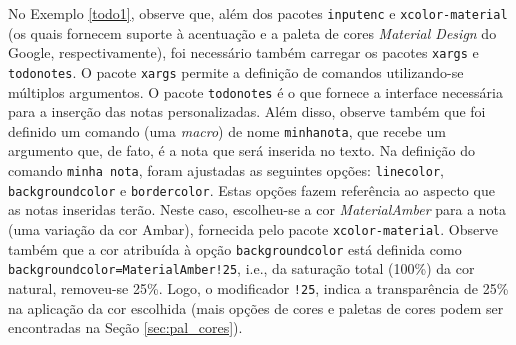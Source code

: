 
No Exemplo \ref{todo1}, observe que, além dos pacotes {\tt inputenc} e {\tt xcolor-material} (os quais fornecem suporte à acentuação e a paleta de cores \textit{Material Design} do Google, respectivamente), foi necessário também carregar os pacotes {\tt xargs} e {\tt todonotes}. O pacote {\tt xargs} permite a definição de comandos utilizando-se múltiplos argumentos. O pacote {\tt todonotes} é o que fornece a interface necessária para a inserção das notas personalizadas. Além disso, observe também que foi definido um comando (uma \textit{macro}) de nome {\tt minhanota}, que recebe um argumento que, de fato, é a nota que será inserida no texto. Na definição do comando {\tt minha nota}, foram ajustadas as seguintes opções: {\tt linecolor}, {\tt backgroundcolor} e {\tt bordercolor}. Estas opções fazem referência ao aspecto que as notas inseridas terão. Neste caso, escolheu-se a cor \textit{MaterialAmber} para a nota (uma variação da cor Ambar), fornecida pelo pacote {\tt xcolor-material}. Observe também que a cor atribuída à opção {\tt backgroundcolor} está definida como \texttt{backgroundcolor=MaterialAmber!25}, i.e., da saturação total (100\%) da cor natural, removeu-se 25\%. Logo, o modificador {\tt !25}, indica a transparência de 25\% na aplicação da cor escolhida (mais opções de cores e paletas de cores podem ser encontradas na Seção \ref{sec:pal_cores}).

